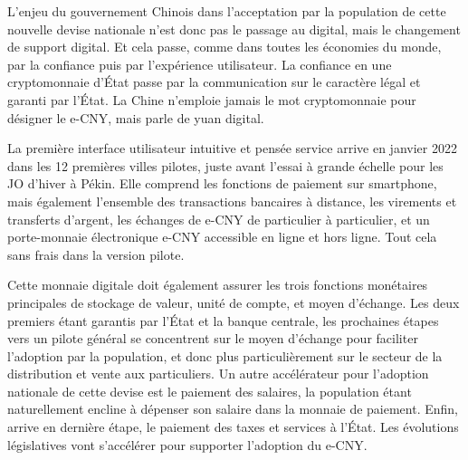 \documentclass[a4paper]{article}
\begin{document}
L’enjeu du gouvernement Chinois dans l’acceptation par la population de cette nouvelle devise nationale n’est donc pas le passage au digital, mais le changement de support digital. Et cela passe, comme dans toutes les économies du monde, par la confiance puis par l’expérience utilisateur. La confiance en une cryptomonnaie d’État passe par la communication sur le caractère légal et garanti par l’État. La Chine n’emploie jamais le mot cryptomonnaie pour désigner le e-CNY, mais parle de yuan digital. 

La première interface utilisateur intuitive et pensée service arrive en janvier 2022 dans les 12 premières villes pilotes, juste avant l’essai à grande échelle pour les JO d’hiver à Pékin. Elle comprend les fonctions de paiement sur smartphone, mais également l’ensemble des transactions bancaires à distance, les virements et transferts d’argent, les échanges de e-CNY de particulier à particulier, et un porte-monnaie électronique e-CNY accessible en ligne et hors ligne. Tout cela sans frais dans la version pilote. 

Cette monnaie digitale doit également assurer les trois fonctions monétaires principales de stockage de valeur, unité de compte, et moyen d’échange. Les deux premiers étant garantis par l’État et la banque centrale, les prochaines étapes vers un pilote général se concentrent sur le moyen d’échange pour faciliter l’adoption par la population, et donc plus particulièrement sur le secteur de la distribution et vente aux particuliers. Un autre accélérateur pour l’adoption nationale de cette devise est le paiement des salaires, la population étant naturellement encline à dépenser son salaire dans la monnaie de paiement. Enfin, arrive en dernière étape, le paiement des taxes et services à l’État. Les évolutions législatives vont s’accélérer pour supporter l’adoption du e-CNY. 
\end{document}

